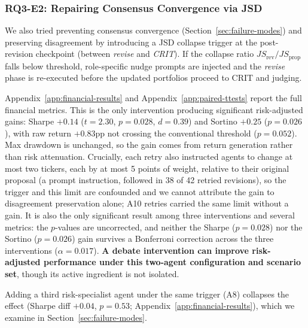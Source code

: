 \documentclass{article}
\begin{document}
\subsubsection{RQ3-E2: Repairing Consensus Convergence via JSD}
\vspace{-0.2cm}
We also tried preventing consensus convergence (Section~\ref{sec:failure-modes}) and preserving disagreement 
by introducing a JSD collapse trigger at the post-revision checkpoint (between \textit{revise} and \textit{CRIT}). If the collapse ratio $JS_{\text{rev}} / JS_{\text{prop}}$ falls below threshold, role-specific nudge prompts are injected and the \textit{revise} phase is re-executed before the updated portfolios proceed to CRIT and judging. 

Appendix~\ref{app:financial-results} and Appendix~\ref{app:paired-ttests} report the full financial metrics. This is the only intervention producing significant risk-adjusted gains: Sharpe $+0.14$ ($t{=}2.30$, $p{=}0.028$, $d{=}0.39$) and Sortino $+0.25$ ($p{=}0.026$), with raw return $+0.83$pp not crossing the conventional threshold ($p{=}0.052$). Max drawdown is unchanged, so the gain comes from return generation rather than risk attenuation. Crucially, each retry also instructed agents to change at most two tickers, each by at most 5 points of weight, relative to their original proposal (a prompt instruction, followed in 38 of 42 retried revisions), so the trigger and this limit are confounded and we cannot attribute the gain to disagreement preservation alone; A10 retries carried the same limit without a gain. It is also the only significant result among three interventions and several metrics: the $p$-values are uncorrected, and neither the Sharpe ($p{=}0.028$) nor the Sortino ($p{=}0.026$) gain survives a Bonferroni correction across the three interventions ($\alpha{=}0.017$). \textbf{A debate intervention can improve risk-adjusted performance under this two-agent configuration and scenario set}, though its active ingredient is not isolated. 

Adding a third risk-specialist agent under the same trigger (A8) collapses the effect (Sharpe diff $+0.04$, $p=0.53$; Appendix~\ref{app:financial-results}), which we examine in Section~\ref{sec:failure-modes}.

\vspace{-0.2cm}
\end{document}
